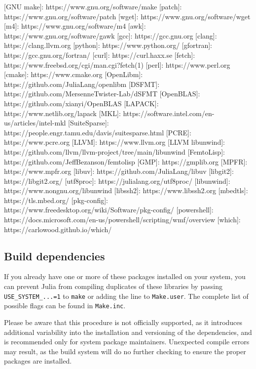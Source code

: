 [GNU make]:     https://www.gnu.org/software/make [patch]:        https://www.gnu.org/software/patch [wget]:         https://www.gnu.org/software/wget [m4]:           https://www.gnu.org/software/m4 [awk]:          https://www.gnu.org/software/gawk [gcc]:          https://gcc.gnu.org [clang]:        https://clang.llvm.org [python]:       https://www.python.org/ [gfortran]:     https://gcc.gnu.org/fortran/ [curl]:         https://curl.haxx.se [fetch]:        https://www.freebsd.org/cgi/man.cgi?fetch(1) [perl]:         https://www.perl.org [cmake]:        https://www.cmake.org [OpenLibm]:     https://github.com/JuliaLang/openlibm [DSFMT]:        https://github.com/MersenneTwister-Lab/dSFMT [OpenBLAS]:     https://github.com/xianyi/OpenBLAS [LAPACK]:       https://www.netlib.org/lapack [MKL]:          https://software.intel.com/en-us/articles/intel-mkl [SuiteSparse]:  https://people.engr.tamu.edu/davis/suitesparse.html [PCRE]:         https://www.pcre.org [LLVM]:         https://www.llvm.org [LLVM libunwind]: https://github.com/llvm/llvm-project/tree/main/libunwind [FemtoLisp]:    https://github.com/JeffBezanson/femtolisp [GMP]:          https://gmplib.org [MPFR]:         https://www.mpfr.org [libuv]:        https://github.com/JuliaLang/libuv [libgit2]:      https://libgit2.org/ [utf8proc]:     https://julialang.org/utf8proc/ [libunwind]:    https://www.nongnu.org/libunwind [libssh2]:      https://www.libssh2.org [mbedtls]:      https://tls.mbed.org/ [pkg-config]:   https://www.freedesktop.org/wiki/Software/pkg-config/ [powershell]:   https://docs.microsoft.com/en-us/powershell/scripting/wmf/overview [which]:        https://carlowood.github.io/which/



\hypertarget{14428860566813867056}{}


\subsection{Build dependencies}



If you already have one or more of these packages installed on your system, you can prevent Julia from compiling duplicates of these libraries by passing \texttt{USE\_SYSTEM\_...=1} to \texttt{make} or adding the line to \texttt{Make.user}. The complete list of possible flags can be found in \texttt{Make.inc}.



Please be aware that this procedure is not officially supported, as it introduces additional variability into the installation and versioning of the dependencies, and is recommended only for system package maintainers. Unexpected compile errors may result, as the build system will do no further checking to ensure the proper packages are installed.



